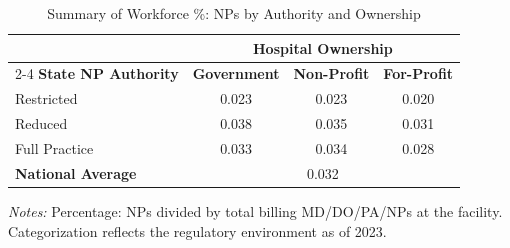 \begin{table}[htbp]
    \centering
    \caption{Summary of Workforce \%: NPs by Authority and Ownership}
    \label{tab:pct_np_own}
    \vspace{0.2cm}
    \begin{tabular}{lccc}
        \toprule
        & \multicolumn{3}{c}{\textbf{Hospital Ownership}} \\
        \cmidrule(lr){2-4}
        \textbf{State NP Authority} & \textbf{Government} & \textbf{Non-Profit} & \textbf{For-Profit} \\
        \midrule
        Restricted & 0.023 & 0.023 & 0.020 \\
        Reduced & 0.038 & 0.035 & 0.031 \\
        Full Practice & 0.033 & 0.034 & 0.028 \\
        \midrule
        \textbf{National Average} & \multicolumn{3}{c}{0.032} \\
        \bottomrule
    \end{tabular}
    \vspace{0.1cm}
    \begin{minipage}{0.85\textwidth}
        \footnotesize \textit{Notes:} Percentage: NPs divided by total billing MD/DO/PA/NPs at the facility. Categorization reflects the regulatory environment as of 2023.
    \end{minipage}
\end{table}
